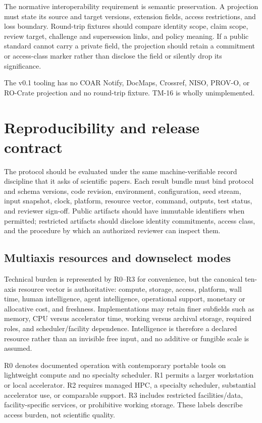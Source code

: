 \documentclass[11pt]{article}
\begin{document}
The normative interoperability requirement is semantic preservation. A projection
must state its source and target versions, extension fields, access restrictions,
and loss boundary. Round-trip fixtures should compare identity scope, claim scope,
review target, challenge and supersession links, and policy meaning. If a public
standard cannot carry a private field, the projection should retain a commitment or
access-class marker rather than disclose the field or silently drop its significance.

\begin{evidencegate}
The v0.1 tooling has no COAR Notify, DocMaps, Crossref, NISO, PROV-O, or RO-Crate
projection and no round-trip fixture. TM-16 is wholly unimplemented.
\end{evidencegate}

\section{Reproducibility and release contract}
\label{sec:repro}

The protocol should be evaluated under the same machine-verifiable record discipline
that it asks of scientific papers. Each result bundle must bind protocol and schema
versions, code revision, environment, configuration, seed stream, input snapshot,
clock, platform, resource vector, command, outputs, test status, and reviewer
sign-off. Public artifacts should have immutable identifiers when permitted;
restricted artifacts should disclose identity commitments, access class, and the
procedure by which an authorized reviewer can inspect them.

\subsection{Multiaxis resources and downselect modes}

Technical burden is represented by R0--R3 for convenience, but the canonical
ten-axis resource vector is authoritative: compute, storage, access, platform,
wall time, human intelligence, agent intelligence, operational support, monetary
or allocative cost, and freshness. Implementations may retain finer subfields such
as memory, CPU versus accelerator time, working versus archival storage, required
roles, and scheduler/facility dependence. Intelligence is therefore a declared
resource rather than an invisible free input, and no additive or fungible scale is
assumed.

R0 denotes documented operation with contemporary portable tools on lightweight
compute and no specialty scheduler. R1 permits a larger workstation or local
accelerator. R2 requires managed HPC, a specialty scheduler, substantial accelerator
use, or comparable support. R3 includes restricted facilities/data, facility-specific
services, or prohibitive working storage. These labels describe access burden, not
scientific quality.
\end{document}
